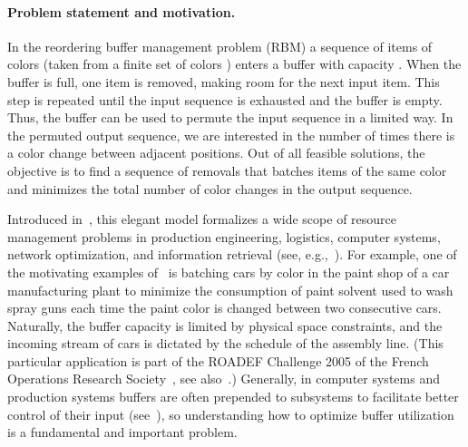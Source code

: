 \documentclass[11pt]{article}
\begin{document}
\paragraph{Problem statement and motivation.}
In the reordering buffer management problem (RBM) a sequence
of  items of colors  (taken from a finite
set of colors ) enters a buffer with capacity . When
the buffer is full, one item is removed, making room for the next
input item. This step is repeated until the input sequence is
exhausted and the buffer is empty. Thus, the buffer can be used
to permute the input sequence in a limited way. In the permuted
output sequence, we are interested in the number of times there
is a color change between adjacent positions. Out of all feasible
solutions, the objective is to find a sequence of removals that
batches items of the same color and minimizes the total number
of color changes in the output sequence.

Introduced in~\cite{RSW02}, this elegant model formalizes a wide
scope of resource management problems in production engineering,
logistics, computer systems, network optimization, and information
retrieval (see, e.g.,~\cite{RSW02,BB02,KRSW04,GSV04}).
For example, one of the motivating examples of~\cite{RSW02} is
batching cars by color in the paint shop of a car manufacturing plant
to minimize the consumption of paint solvent used to wash spray guns
each time the paint color is changed between two consecutive cars.
Naturally, the buffer capacity is limited by physical space constraints,
and the incoming stream of cars is dictated by the schedule of the
assembly line. (This particular application is part of the ROADEF
Challenge 2005 of the French Operations Research Society~\cite{ROADEF2005},
see also~\cite{GSV04}.)
Generally, in computer systems and production systems buffers
are often prepended to subsystems to facilitate better control of
their input (see~\cite{SGG09,LM09}), so understanding how to optimize
buffer utilization is a fundamental and important problem.
\end{document}
